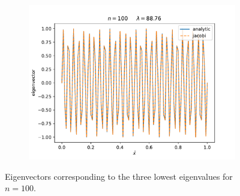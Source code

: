 \documentclass[english,notitlepage]{revtex4-1}  %
\begin{document}
\begin{enumerate}[label= \alph*)]
\begin{figure}[H]
\begin{subfigure}{.45 \textwidth}
        \includegraphics[width=1.1\textwidth]{../figures/eigvec_100_2.pdf}
        \caption{}
        \label{fig:eigvec_100_2}
    \end{subfigure}
    \caption{Eigenvectors corresponding to the three lowest eigenvalues for $n=100$.}
    \label{fig:eigvec_100}
    \end{figure}

\end{enumerate}
\end{document}
